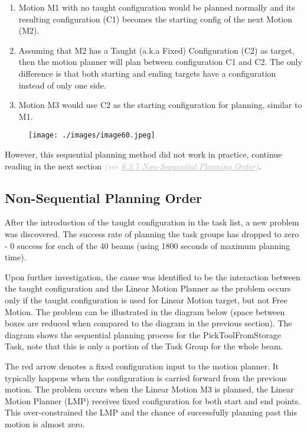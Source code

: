 \begin{enumerate}
	\item Motion M1 with no taught configuration would be planned normally and its resulting configuration (C1) becomes the starting config of the next Motion (M2). 

	\item Assuming that M2 has a Taught (a.k.a Fixed) Configuration (C2) as target, then the motion planner will plan between configuration C1 and C2. The only difference is that both starting and ending targets have a configuration instead of only one side.

	\item Motion M3 would use C2 as the starting configuration for planning, similar to M1.

\end{enumerate}
\begin{figure}[H]
\texttt{[image: ./images/image60.jpeg]}
\end{figure}


However, this sequential planning method did not work in practice, continue reading in the next section \textit{\textcolor[HTML]{B7B7B7}{(see \uline{6.3.7 Non-Sequential Planning Order})}}.

\subsection{Non-Sequential Planning Order}

After the introduction of the taught configuration in the task list, a new problem was discovered. The success rate of planning the task groups has dropped to zero - 0 success for each of the 40 beams (using 1800 seconds of maximum planning time).

Upon further investigation, the cause was identified to be the interaction between the taught configuration and the Linear Motion Planner as the problem occurs only if the taught configuration is used for Linear Motion target, but not Free Motion. The problem can be illustrated in the diagram below (space between boxes are reduced when compared to the diagram in the previous section). The diagram shows the sequential planning process for the PickToolFromStorage Task, note that this is only a portion of the Task Group for the whole beam. 

The red arrow denotes a fixed configuration input to the motion planner. It typically happens when the configuration is carried forward from the previous motion. The problem occurs when the Linear Motion M3 is planned, the Linear Motion Planner (LMP) receives fixed configuration for both start and end points. This over-constrained the LMP and the chance of successfully planning past this motion is almost zero.

